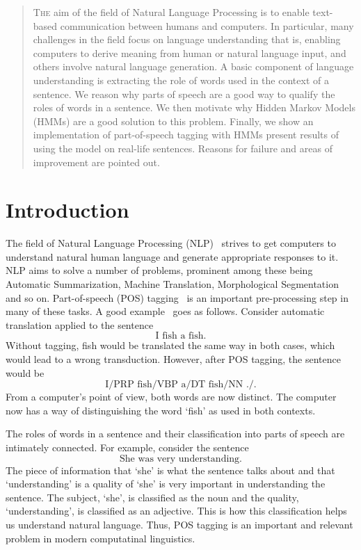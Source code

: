 \documentclass[11pt]{article}
\begin{document}
\maketitle

\begin{abstract}
\lettrine[lines=2]{T}{he} aim of the field of Natural Language Processing is to enable text-based communication between humans and computers. In particular, many challenges in the field focus on language understanding that is, enabling computers to derive meaning from human or natural language input, and others involve natural language generation. A basic component of language understanding is extracting the role of words used in the context of a sentence. We reason why parts of speech are a good way to qualify the roles of words in a sentence. We then motivate why Hidden Markov Models (HMMs) are a good solution to this problem. Finally, we show an implementation of part-of-speech tagging with HMMs present results of using the model on real-life sentences. Reasons for failure and areas of improvement are pointed out.
\end{abstract}

\section{Introduction}
The field of Natural Language Processing (NLP)~\cite{wiki:nlp} strives to get computers to understand natural human language and generate appropriate responses to it. NLP aims to solve a number of problems, prominent among these being Automatic Summarization, Machine Translation, Morphological Segmentation and so on. Part-of-speech (POS) tagging~\cite{wiki:pos} is an important pre-processing step in many of these tasks. A good example~\cite{so:uses} goes as follows. Consider automatic translation applied to the sentence
%
$$\text{I fish a fish.}$$
%
Without tagging, fish would be translated the same way in both cases, which would lead to a wrong transduction. However, after POS tagging, the sentence would be
%
$$\text{I/PRP fish/VBP a/DT fish/NN ./.}$$
%
From a computer's point of view, both words are now distinct. The computer now has a way of distinguishing the word `fish' as used in both contexts.

The roles of words in a sentence and their classification into parts of speech are intimately connected. For example, consider the sentence
%
$$\text{She was very understanding.}$$
%
The piece of information that `she' is what the sentence talks about and that `understanding' is a quality of `she' is very important in understanding the sentence. The subject, `she', is classified as the noun and the quality, `understanding', is classified as an adjective. This is how this classification helps us understand natural language. Thus, POS tagging is an important and relevant problem in modern computatinal linguistics.
\end{document}
